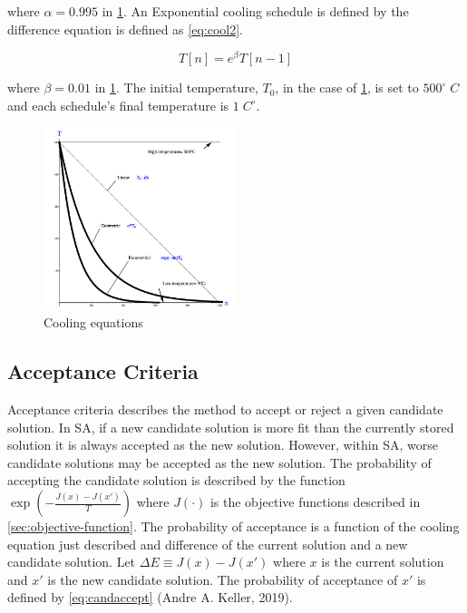 \documentclass[11pt,a4paper,final]{article}
\newcommand{\Tau}{T}                        %
\begin{document}
where \(\alpha = 0.995\) in \ref{fig:cool}. An Exponential cooling schedule is defined by the difference equation is defined as
\ref{eq:cool2}.

\begin{equation}
\label{eq:cool2}
\Tau[n] = e^{\beta}\Tau[n-1]
\end{equation}

where \(\beta = 0.01\) in \ref{fig:cool}. The initial temperature, \(T_0\), in the case of \ref{fig:cool}, is set to \(500^\circ\; C\) and
each schedule's final temperature is \(1\; C^\circ\).

\begin{figure}[htbp]
\centering
\includegraphics[width=0.5\textwidth]{sections/img/cool-func.jpg}
\caption{\label{fig:cool}Cooling equations}
\end{figure}

\subsection{Acceptance Criteria}
\label{sec:acceptance}
Acceptance criteria describes the method to accept or reject a given candidate solution. In SA, if a new candidate
solution is more fit than the currently stored solution it is always accepted as the new solution. However, within SA,
worse candidate solutions may be accepted as the new solution. The probability of accepting the candidate solution is
described by the function \(\exp(-\frac{J(x) - J(x')}{\Tau})\) where \(J(\cdot)\) is the objective functions described in
\ref{sec:objective-function}. The probability of acceptance is a function of the cooling equation just described and
difference of the current solution and a new candidate solution. Let \(\Delta E \equiv J(x) - J(x')\) where \(x\) is the current
solution and \(x'\) is the new candidate solution. The probability of acceptance of \(x'\) is defined by \ref{eq:candaccept}
(Andre A. Keller, 2019).
\end{document}

